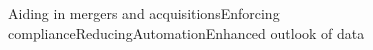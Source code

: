 \documentclass[preview]{standalone}
\begin{document}
\begin{center}
Aiding in mergers and acquisitionsEnforcing complianceReducingAutomationEnhanced outlook of data
\end{center}
\end{document}
